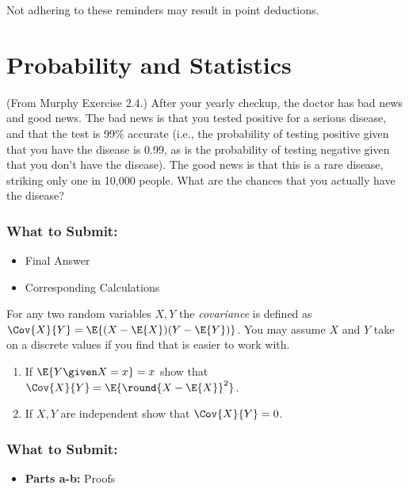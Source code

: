 \documentclass{article}
\begin{document}
Not adhering to these reminders may result in point deductions. \\



\clearpage{}



\section*{Probability and Statistics}
\begin{aprob}
     (From Murphy Exercise 2.4.) 
    After your yearly checkup, the doctor has bad news and good news. 
    The bad news is that you tested positive for a serious disease, and that the test is 99\% accurate (i.e., the probability of testing positive given that you have the disease is 0.99, as is the probability of testing negative given that you don't have the disease).
    The good news is that this is a rare disease, striking only one in 10,000 people.
    What are the chances that you actually have the disease?
    
    \subsubsection*{What to Submit:}
    \begin{itemize}
        \item Final Answer
        \item Corresponding Calculations
    \end{itemize}
\end{aprob}

\begin{aprob}
    For any two random variables $X,Y$ the \emph{covariance} is defined as $\Cov{X}{Y}=\E{(X-\E{X})(Y-\E{Y})}$. 
    You may assume $X$ and $Y$ take on a discrete values if you find that is easier to work with.
    \begin{enumerate}
        \item {} If $\E{Y\given X=x} = x$ show that $\Cov{X}{Y} = \E{\round{X-\E{X}}^2}$.  
        \item {} If $X, Y$ are independent show that $\Cov{X}{Y}=0$.
    \end{enumerate}

    \subsubsection*{What to Submit:}
    \begin{itemize}
        \item \textbf{Parts a-b:} Proofs
    \end{itemize}
\end{aprob}
\end{document}
